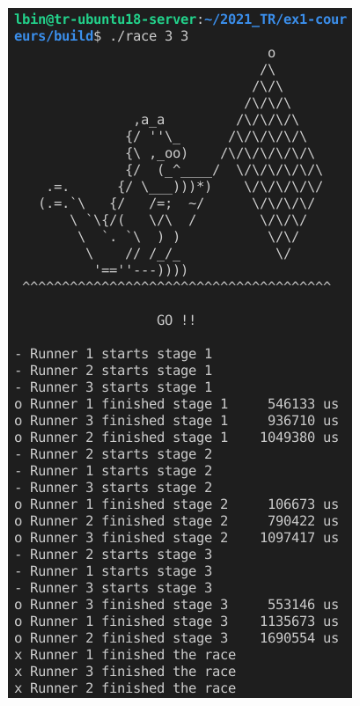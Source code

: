 \documentclass{article}
\begin{document}
\begin{figure}[H]
\begin{subfigure}[b]{.48\textwidth}
        \end{subfigure}
        \begin{subfigure}[b]{.48\textwidth}
            \centering
            \includegraphics[width=.91\textwidth]{./screenshots/race332.png}
        \end{subfigure}
    \end{figure}
\end{document}
